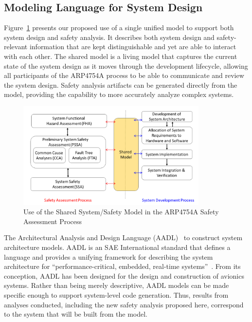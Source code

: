 \subsection{Modeling Language for System Design}
\label{sec:modelingLanugage}
Figure~\ref{fig:proposed_safety_process} presents our proposed use of a single unified model to support both system design and safety analysis. It describes both system design and safety-relevant information 
that are kept distinguishable and yet are able to interact with each other. The shared model is a living model that captures the current state of the system design as it moves through the development lifecycle, allowing all participants of the ARP4754A process to be able to communicate and review the system design. Safety analysis artifacts can be generated directly from the model, 
providing
the capability to more accurately analyze complex systems.

\begin{figure}[t!]
	
	\centering
	\includegraphics[trim=0 5 0 5,clip,width=0.85\textwidth]{images/process3.png}
	
	\caption{Use of the Shared System/Safety Model in the ARP4754A Safety Assessment Process}
	\label{fig:proposed_safety_process}
\end{figure}

The Architectural Analysis and Design Language (AADL)~\cite{FeilerModelBasedEngineering2012} to construct system architecture models.  AADL is an SAE International standard that defines a language and provides a unifying framework for describing the system architecture for ``performance-critical, embedded, real-time systems''~\cite{AADL_Standard}. From its conception, AADL has been designed for the design and construction of avionics systems.  
Rather than being merely descriptive, AADL models can be made specific enough to support system-level code generation.  Thus, results from analyses conducted, including the new safety analysis proposed here, correspond to the system that will be built from the model.  

